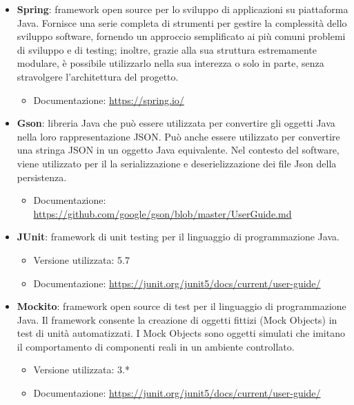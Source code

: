 \begin{itemize}
	\item \textbf{Spring}: framework open source per lo sviluppo di applicazioni su piattaforma Java. Fornisce una serie completa di strumenti per gestire la complessità dello sviluppo software, fornendo un approccio semplificato ai più comuni problemi di sviluppo e di testing; inoltre, grazie alla sua struttura estremamente modulare, è possibile utilizzarlo nella sua interezza o solo in parte, senza stravolgere l’architettura del progetto.
	\begin{itemize}
		\item Documentazione: \url{https://spring.io/}
	\end{itemize}
	\item \textbf{Gson}: libreria Java che può essere utilizzata per convertire gli oggetti Java nella loro rappresentazione JSON. Può anche essere utilizzato per convertire una stringa JSON in un oggetto Java equivalente. Nel contesto del software, viene utilizzato per il la serializzazione e deserielizzazione dei file Json della persistenza.
	\begin{itemize}
	\item Documentazione: \url{https://github.com/google/gson/blob/master/UserGuide.md}
	\end{itemize}
	\item \textbf{JUnit}: framework di unit testing per il linguaggio di programmazione Java.
	\begin{itemize}
		\item Versione utilizzata: 5.7
		\item Documentazione: \url{https://junit.org/junit5/docs/current/user-guide/}
	\end{itemize}

	\item \textbf{Mockito}: framework open source di test per il linguaggio di programmazione Java. Il framework consente la creazione di oggetti fittizi (Mock Objects) in test di unità automatizzati. I Mock Objects sono oggetti simulati che imitano il comportamento di componenti reali in un ambiente controllato.
		\begin{itemize}
		\item Versione utilizzata: 3.*
		\item Documentazione: \url{https://junit.org/junit5/docs/current/user-guide/}
	\end{itemize}

\end{itemize}